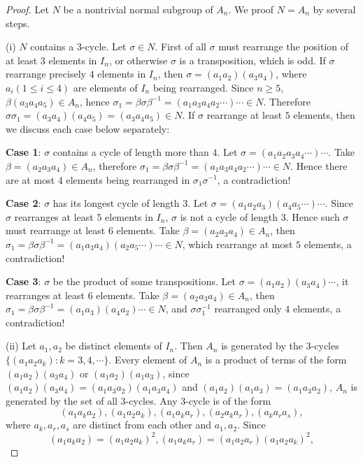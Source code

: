 \begin{proof}
Let $N$ be a nontrivial normal subgroup of $A_n$. We proof $N=A_n$ by several steps.\par
(i) $N$ contains a $3$-cycle. Let $\sigma\in N$. First of all $\sigma$ must rearrange the position of at least $3$ elements in $I_n$, or otherwise $\sigma$ is a transposition, which is odd. If $\sigma$ rearrange precisely $4$ elements in $I_n$, then $\sigma=(a_1a_2)(a_3a_4)$, where $a_i(1\le i\le 4)$ are elements of $I_n$ being rearranged. Since $n\ge 5$, $\beta(a_3a_4a_5)\in A_n$, hence $\sigma_1=\beta\sigma\beta^{-1}=(a_1a_3a_4a_2\cdots)\cdots\in N$. Therefore $\sigma\sigma_1=(a_3a_4)(a_4a_5)=(a_3a_4a_5)\in N$. If $\sigma$ rearrange at least $5$ elements, then we discuss each case below separately:\par
\textbf{Case 1}: $\sigma$ contains a cycle of length more than $4$. Let $\sigma=(a_1a_2a_3a_4\cdots)\cdots$. Take $\beta=(a_2a_3a_4)\in A_n$, therefore $\sigma_1=\beta\sigma\beta^{-1}=(a_1a_3a_4a_2\cdots)\cdots\in N$. Hence there are at most $4$ elements being rearranged in $\sigma_1\sigma^{-1}$, a contradiction!\par
\textbf{Case 2}: $\sigma$ has its longest cycle of length $3$. Let $\sigma=(a_1a_2a_3)(a_4a_5\cdots)\cdots$. Since $\sigma$ rearranges at least $5$ elements in $I_n$, $\sigma$ is not a cycle of length $3$. Hence such $\sigma$ must rearrange at least $6$ elements. Take $\beta=(a_2a_3a_4)\in A_n$, then $\sigma_1=\beta\sigma\beta^{-1}=(a_1a_3a_4)(a_2a_5\cdots)\cdots\in N$, which rearrange at most $5$ elements, a contradiction!\par
\textbf{Case 3}: $\sigma$ be the product of some transpositions. Let $\sigma=(a_1a_2)(a_3a_4)\cdots$, it rearranges at least $6$ elements. Take $\beta=(a_2a_3a_4)\in A_n$, then $\sigma_1=\beta\sigma\beta^{-1}=(a_1a_3)(a_4a_2)\cdots\in N$, and $\sigma\sigma_1^{-1}$ rearranged only $4$ elements, a contradiction!\par
(ii) Let $a_1,a_2$ be distinct elements of $I_n$. Then $A_n$ is generated by the $3$-cycles $\{(a_1a_2a_k):k=3,4,\cdots\}$. Every element of $A_n$ is a product of terms of the form $(a_1a_2)(a_3a_4)$ or $(a_1a_2)(a_1a_3)$, since $(a_1a_2)(a_3a_4)=(a_1a_3a_2)(a_1a_3a_4)$ and $(a_1a_2)(a_1a_3)=(a_1a_3a_2)$, $A_n$ is generated by the set of all $3$-cycles. Any $3$-cycle is of the form 
$$(a_1a_ka_2),(a_1a_2a_k),(a_1a_ka_r),(a_2a_ka_r),(a_ka_ra_s),$$ where $a_k,a_r,a_s$ are distinct from each other and $a_1,a_2$. Since 
$$
\left( a_1a_ka_2 \right) =\left( a_1a_2a_k \right) ^2,\left( a_1a_ka_r \right) =\left( a_1a_2a_r \right) \left( a_1a_2a_k \right) ^2,
$$
\end{proof}
